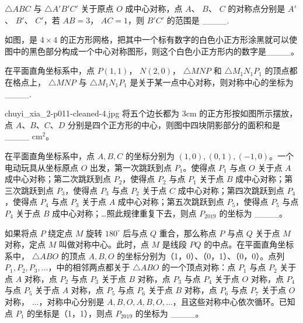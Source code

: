 \item
  $\triangle ABC$ 与 $\triangle A'B'C'$ 关于原点 $O$ 成中心对称，点 $A$、 $B$、 $C$ 的对称点分别是 $A'$、 $B'$、 $C'$，若 $AB=3$， $AC=1$，则 $B'C'$ 的范围是 \_\_\_\_.\underline{\hspace{2cm}}

\item
  如图，是 $4\times 4$ 的正方形网格，把其中一个标有数字的白色小正方形涂黑就可以使图中的黑色部分构成一个中心对称图形，则这个白色小正方形内的数字是\_\_\_\_。\underline{\hspace{2cm}}


\item
  在平面直角坐标系中，点 $P(1,1)$， $N(2,0)$， $\triangle MNP$ 和 $\triangle M_1N_1P_1$ 的顶点都在格点上， $\triangle MNP$ 与 $\triangle M_1N_1P_1$ 是关于某一点中心对称，则对称中心的坐标为 \_\_\_\_.\underline{\hspace{2cm}}


\item
  \begin{questionwithimage}{chuyi_xia_2-p011-cleaned-4.jpg}
  将五个边长都为 3cm 的正方形按如图所示摆放，点 $A$、$B$、$C$、$D$ 分别是四个正方形的中心，则图中四块阴影部分的面积和是 \_\_\_\_ cm$^2$。
  \end{questionwithimage}

\item
  在平面直角坐标系中，点 $A, B, C$ 的坐标分别为 $(1, 0),(0, 1),(-1, 0)$。一个电动玩具从坐标原点 $O$ 出发，第一次跳跃到点 $P_{1}$。使得点 $P_{1}$ 与点 $O$ 关于点 $A$ 成中心对称；第二次跳跃到点 $P_{2}$，使得点 $P_{2}$ 与点 $P_{1}$ 关于点 $B$ 成中心对称；第三次跳跃到点 $P_{3}$，使得点 $P_{3}$ 与点 $P_{2}$ 关于点 $C$ 成中心对称；第四次跳跃到点 $P_{4}$，使得点 $P_{4}$ 与点 $P_{3}$ 关于点 $A$ 成中心对称；第五次跳跃到点 $P_{5}$，使得点 $P_{5}$ 与点 $P_{4}$ 关于点 $B$ 成中心对称；…照此规律重复下去，则点 $P_{2019}$ 的坐标为 \_\_\_\_。\underline{\hspace{2cm}}

\item
  如果将点 $P$ 绕定点 $M$ 旋转 $180^{\circ}$ 后与点 $Q$ 重合，那么称点 $P$ 与点 $Q$ 关于点 $M$ 对称，定点 $M$ 叫做对称中心。此时，点 $M$ 是线段 $PQ$ 的中点。在平面直角坐标系中， $\triangle ABO$ 的顶点 $A, B, O$ 的坐标分别为（1，0）、（0，1）、（0，0）。点列 $P_{1}, P_{2}, P_{3}, \ldots$，中的相邻两点都关于 $\triangle ABO$ 的一个顶点对称：点 $P_{1}$ 与点 $P_{2}$ 关于点 $A$ 对称，点 $P_{2}$ 与点 $P_{3}$ 关于点 $B$ 对称，点 $P_{3}$ 与点 $P_{4}$ 关于点 $O$ 对称，点 $P_{4}$ 与点 $P_{5}$ 关于点 $A$ 对称，点 $P_{5}$ 与点 $P_{6}$ 关于点 $B$ 对称，点 $P_{6}$ 与点 $P_{7}$ 关于点 $O$ 对称， $\ldots$，对称中心分别是 $A, B, O, A, B, O, \ldots$，且这些对称中心依次循环。已知点 $P_{1}$ 的坐标是（1，1），则点 $P_{2019}$ 的坐标为 \_\_\_\_。\underline{\hspace{2cm}}

